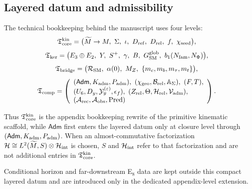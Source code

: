 \subsection{Layered datum and admissibility}

\begin{construction}
The technical bookkeeping behind the manuscript uses four levels:
\[
\Tcore^{\mathrm{kin}}
=
\bigl(
\widetilde M\to M,\ \Seam,\ \inv,\ D_{\mathrm{ref}},\ D_{\mathrm{rel}},\ f,\ \chiseed
\bigr),
\]
\[
\Tker
=
\bigl(
E_3\oplus E_2,\ Y,\ S^+,\ \gamma,\ B,\ G_{\SM}^{\mathrm{glob}},\ \bone(N_{\mathrm{fam}},N_\Phi)
\bigr),
\]
\[
\mathfrak T_{\mathrm{bridge}}
=
\bigl(
\mathcal R_{\mathrm{SM}},\ \alpha(0),\ M_Z,\ \{m_c,m_b,m_\tau,m_t\}
\bigr),
\]
\[
\Tcomp
=
\left(
\begin{array}{l}
(\mathsf{Adm},\Kadm,\Padm),\ (\chigeo,\mathcal B_{\mathrm{rel}},\mathbb A_{\Seam}),\ (F,T),\\
(U_6,D_y,\mathcal Y_y^{(\varepsilon)},\epsilon_f),\ (Z_{\mathrm{rel}},\Theta,\Hrel,\Vadm),\\
(\Arec,\Aobs,\Pred)
\end{array}
\right).
\]
\end{construction}

Thus $\mathfrak T_{\mathrm{core}}^{\mathrm{kin}}$ is the appendix bookkeeping rewrite of the primitive kinematic
scaffold, while $\mathsf{Adm}$ first enters the layered datum only at closure level through
$(\mathsf{Adm},K_{\mathrm{adm}},P_{\mathrm{adm}})$. When an almost-commutative factorization
$\mathcal H\cong L^2(\widetilde M,S)\otimes\mathcal H_{\mathrm{int}}$ is chosen, $S$ and $\mathcal H_{\mathrm{int}}$ refer to that
factorization and are not additional entries in $\mathfrak T_{\mathrm{core}}^{\mathrm{kin}}$.

Conditional horizon and far-downstream E$_8$ data are kept outside this compact layered datum and are introduced only in the dedicated appendix-level extension.

